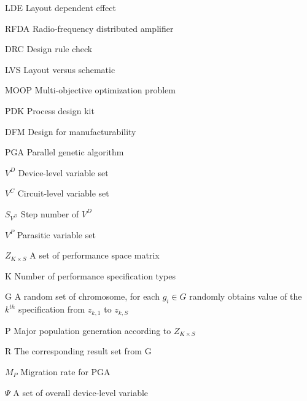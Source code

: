\begin{SymEntry}

\item[LDE]
Layout dependent effect 

\item[RFDA]
Radio-frequency distributed amplifier

\item[DRC]
Design rule check

\item[LVS]
Layout versus schematic

\item[MOOP]
Multi-objective optimization problem

\item[PDK]
Process design kit

\item[DFM]
Design for manufacturability


\item[PGA]
Parallel genetic algorithm

\item[$V^D$]
Device-level variable set

\item[$V^C$]
Circuit-level variable set

\item[$S_{V^D}$]
Step number of $V^D$

\item[$V^P$]
Parasitic variable set

\item[$Z_{K\times S}$]
A set of performance space matrix

\item[K]
Number of performance specification types

\item[G]
A random set of chromosome, for each $g_i \in G$ randomly obtains value of the $k^{th}$ specification from $z_{k,1}$ to $z_{k,S}$ 

\item[P]
Major population generation according to $Z_{K\times S}$

\item[R]
The corresponding result set from G

\item[$M_P$]
Migration rate for PGA

\item[$\Psi $]
A set of overall device-level variable


\end{SymEntry}

